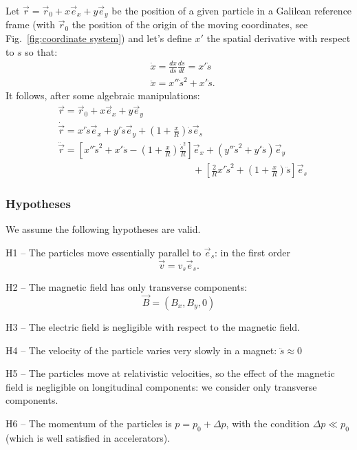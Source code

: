 Let $\vec{r} = \vec{r}_0 + x\vec{e}_x + y \vec{e}_y$ be the position of a given particle in a Galilean reference frame (with $\vec{r}_0$ the position of the origin of the moving coordinates, see Fig.~\ref{fig:coordinate system}) and let's define $x'$ the spatial derivative with respect to $s$ so that:
\begin{equation}
\begin{aligned}
&\dot{x}= \frac{dx}{ds}\frac{ds}{dt} = x'\dot{s}  \\
&\ddot{x}= x''\dot{s}^2+x'\ddot{s}.
\end{aligned}
\end{equation}
It follows, after some algebraic manipulations:
\begin{align}
\label{eq:kinematics}
&\vec{r} = \vec{r}_0 + x\vec{e}_x + y \vec{e}_y \nonumber \\
&\dot{\vec{r}}= x' \dot{s} \vec{e}_x + y'\dot{s} \vec{e}_y  + \left(1+\frac{x}{R}\right)\dot{s}\vec{e}_s\\
&\ddot{\vec{r}}= \left[x'' \dot{s}^2 + x' \ddot{s} - \left( 1+\frac{x}{R} \right)\frac{\dot{s}^2}{R}\right] \vec{e}_x + (y''\dot{s}^2 + y'\ddot{s}) \vec{e}_y \nonumber \\
& \hspace{14em} + \left[\frac{2}{R}x'\dot{s}^2 +\left(1+\frac{x}{R}\right)\ddot{s}\right]\vec{e}_s \nonumber
\end{align}

\subsubsection{Hypotheses} We assume the following hypotheses are valid.
\begin{description}
    \item{H1 --} The particles move essentially parallel to $\vec{e}_s$: in the first order
    \begin{equation*}
        \vec{v} = v_s \vec{e}_s.
    \end{equation*}
    \item{H2 --} The magnetic field has only transverse components:
        \begin{equation*}
        \vec{B} = (B_x, B_y, 0)
        \end{equation*}
    \item{H3 --} The electric field is negligible with respect to the magnetic field.
    \item{H4 --} The velocity of the particle varies very slowly in a magnet: $\ddot{s} \approx 0$
    \item{H5 --} The particles move at relativistic velocities, so the effect of the magnetic field is negligible on longitudinal components: we consider only transverse components.
    \item{H6 --} The momentum of the particles is $p = p_0+\Delta p$, with the condition $\Delta p \ll p_0$ (which is well satisfied in accelerators).
\end{description}

